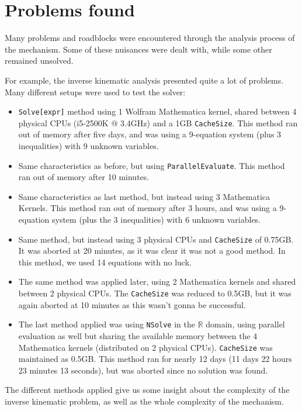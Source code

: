 \documentclass[titlepage, letterpaper]{article}
\begin{document}
\section{Problems found}
\label{sec:problems}

Many problems and roadblocks were encountered through the analysis process of the mechanism.
Some of these nuisances were dealt with, while some other remained unsolved.

For example, the inverse kinematic analysis presented quite a lot of problems.
Many different setups were used to test the solver:

\begin{itemize}
    \item \texttt{Solve[expr]} method using 1 Wolfram Mathematica kernel, shared between 4 physical CPUs (i5-2500K @ 3.4GHz) and a 1GB \texttt{CacheSize}. This method ran out of memory after five days, and was using a 9-equation system (plus 3 inequalities) with 9 unknown variables.
    \item Same characteristics as before, but using \texttt{ParallelEvaluate}. This method ran out of memory after 10 minutes.
    \item Same characteristics as last method, but instead using 3 Mathematica Kernels. This method ran out of memory after 3 hours, and was using a 9-equation system (plus the 3 inequalities) with 6 unknown variables.
    \item Same method, but instead using 3 physical CPUs and \texttt{CacheSize} of 0.75GB. It was aborted at 20 minutes, as it was clear it was not a good method. In this method, we used 14 equations with no luck.
    \item The same method was applied later, using 2 Mathematica kernels and shared between 2 physical CPUs. The \texttt{CacheSize} was reduced to 0.5GB, but it was again aborted at 10 minutes as this wasn't gonna be successful.
    \item The last method applied was using \texttt{NSolve} in the $\mathbb{R}$ domain, using parallel evaluation as well but sharing the available memory between the 4 Mathematica kernels (distributed on 2 physical CPUs). \texttt{CacheSize} was maintained as 0.5GB.
    This method ran for nearly 12 days (11 days 22 hours 23 minutes 13 seconds), but was aborted since no solution was found.
\end{itemize}

The different methods applied give us some insight about the complexity of the inverse kinematic problem, as well as the whole complexity of the mechanism.
\end{document}
